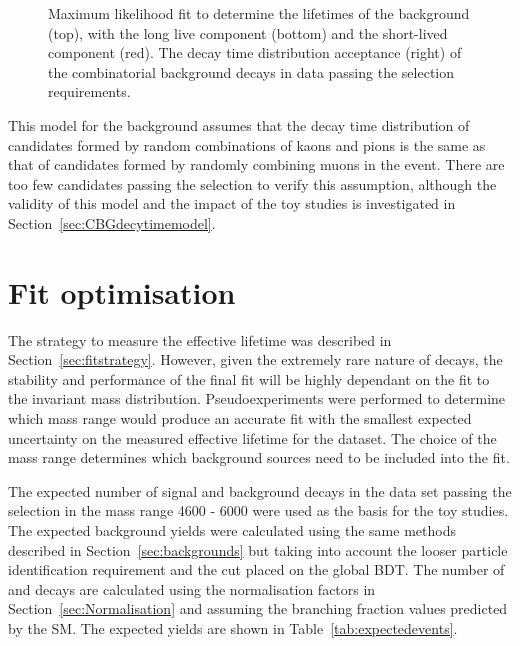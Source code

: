 {\begin{figure}[tbp]
\begin{subfigure}[b]{0.48\textwidth}
   \end{subfigure}
    \caption{Maximum likelihood fit to determine the lifetimes of the background (top), with the long live component (bottom) and the short-lived component (red). The decay time distribution acceptance (right) of the combinatorial background decays in data passing the \bhh selection requirements.}
    \label{fig:CBGaccpt}
\end{figure}

This model for the background assumes that the decay time distribution of \bhh candidates formed by random combinations of kaons and pions is the same as that of \bsmumu candidates formed by randomly combining muons in the event. There are too few candidates passing the \bsmumu selection to verify this assumption, although the validity of this model and the impact of the toy studies is investigated in Section~\ref{sec:CBGdecytimemodel}.%


\section{Fit optimisation}
\label{sec:toys}
The strategy to measure the \bsmumu effective lifetime was described in Section~\ref{sec:fitstrategy}. However, given the extremely rare nature of \bsmumu decays, the stability and performance of the final fit will be highly dependant on the fit to the invariant mass distribution. Pseudoexperiments were performed to determine which mass range would produce an accurate fit with the smallest expected uncertainty on the measured effective lifetime for the dataset. The choice of the mass range determines which background sources need to be included into the fit.


The expected number of signal and background decays in the data set passing the \bsmumu selection in the mass range 4600 - 6000 \mevcc were used as the basis for the toy studies. The expected background yields were calculated using the same methods described in Section~\ref{sec:backgrounds} but taking into account the looser particle identification requirement and the cut placed on the global BDT. The number of \bsmumu and \bdmumu decays are calculated using the normalisation factors in Section~\ref{sec:Normalisation} and assuming the branching fraction values predicted by the SM. The expected yields are shown in Table~\ref{tab:expectedevents}. 


}
